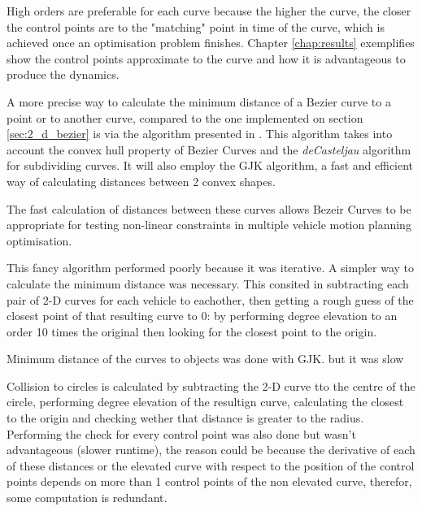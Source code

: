 \par High orders are preferable for each curve because  the higher the curve, the closer the control points are to the "matching" point in time of the curve, which is achieved once an optimisation problem finishes. Chapter \ref{chap:results} exemplifies show the control points approximate to the curve and how it is advantageous to produce the dynamics.

\par A more precise way to calculate the minimum distance of a Bezier curve to a point or to another curve, compared to the one implemented on section \ref{sec:2_d_bezier} is via the algorithm presented in \cite{chang2011computation}. This algorithm takes into account the convex hull property of Bezier Curves and the \textit{deCasteljau} algorithm for subdividing curves. It will also employ the GJK algorithm, a fast and efficient way of calculating distances between 2 convex shapes\cite{cichella2018bernstein}.
\par The fast calculation of distances between these curves allows Bezeir Curves to be appropriate for testing non-linear constraints in multiple vehicle motion planning optimisation.

\par This fancy algorithm performed poorly because it was iterative. A simpler way to calculate the minimum distance was necessary. This consited in subtracting each pair of 2-D curves for each vehicle to eachother, then getting a rough guess of the closest point of that resulting curve to 0: by performing degree elevation to an order 10 times the original then looking for the closest point to the origin. 

\par Minimum distance of the curves to objects was done with GJK. but it was slow

\par Collision to circles is calculated by subtracting the 2-D curve tto the centre of the circle, performing degree elevation of the resultign curve, calculating the closest to the origin and checking wether that distance is greater to the radius. Performing the check for every control point was also done but wasn't advantageous (slower runtime), the reason could be because the derivative of each of these distances or the elevated curve with respect to the position of the control points depends on more than 1 control points of the non elevated curve, therefor, some computation is redundant.


